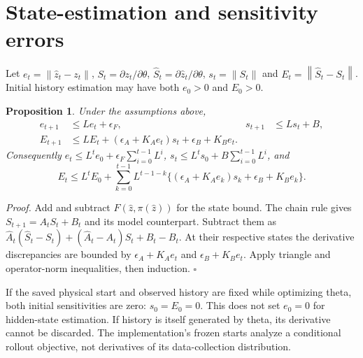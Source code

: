 \documentclass{article}
\newtheorem{proposition}{Proposition}
\newcommand{\norm}[1]{\left\|#1\right\|}
\begin{document}
\section{State-estimation and sensitivity errors}
Let $e_t=\norm{\widehat z_t-z_t}$, $S_t=\partial z_t/\partial\theta$, $\widehat S_t=\partial\widehat z_t/\partial\theta$, $s_t=\norm{S_t}$ and $E_t=\norm{\widehat S_t-S_t}$. Initial history estimation may have both $e_0>0$ and $E_0>0$.
\begin{proposition}
Under the assumptions above,
\begin{align}
e_{t+1}&\le Le_t+\epsilon_F, &s_{t+1}&\le Ls_t+B,\\
E_{t+1}&\le LE_t+(\epsilon_A+K_Ae_t)s_t+\epsilon_B+K_Be_t.\label{eq:rec}
\end{align}
Consequently $e_t\le L^te_0+\epsilon_F\sum_{i=0}^{t-1}L^i$, $s_t\le L^ts_0+B\sum_{i=0}^{t-1}L^i$, and
\[
E_t\le L^tE_0+\sum_{k=0}^{t-1}L^{t-1-k}\{(\epsilon_A+K_Ae_k)s_k+\epsilon_B+K_Be_k\}.
\]
\end{proposition}
\noindent\textit{Proof.} Add and subtract $F(\widehat z,\pi(\widehat z))$ for the state bound. The chain rule gives $S_{t+1}=A_tS_t+B_t$ and its model counterpart. Subtract them as
$\widehat A_t(\widehat S_t-S_t)+(\widehat A_t-A_t)S_t+\widehat B_t-B_t$.
At their respective states the derivative discrepancies are bounded by $\epsilon_A+K_Ae_t$ and $\epsilon_B+K_Be_t$. Apply triangle and operator-norm inequalities, then induction. $\square$

If the saved physical start and observed history are fixed while optimizing theta, both initial sensitivities are zero: $s_0=E_0=0$. This does not set $e_0=0$ for hidden-state estimation. If history is itself generated by theta, its derivative cannot be discarded. The implementation's frozen starts analyze a conditional rollout objective, not derivatives of its data-collection distribution.
\end{document}
